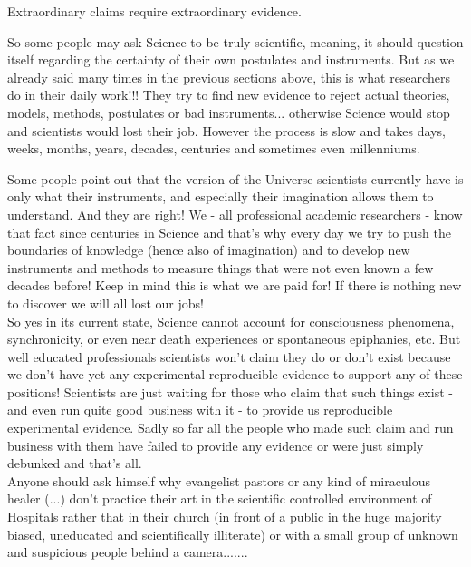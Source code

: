 	\begin{fquote}Extraordinary claims require extraordinary evidence.
 	\end{fquote}

	 So some people may ask Science to be truly scientific, meaning, it should question itself regarding the certainty of their own postulates and instruments. But as we already said many times in the previous sections above, this is what researchers do in their daily work!!! They try to find new evidence to reject actual theories, models, methods, postulates or bad instruments... otherwise Science would stop and scientists would lost their job. However the process is slow and takes days, weeks, months, years, decades, centuries and sometimes even millenniums.
	 
	\begin{tcolorbox}[enhanced,title=Remark,colframe=black,arc=10pt,drop lifted shadow,after skip=15pt plus 2pt,,breakable]
	Some people point out that the version of the Universe scientists currently have is only what their instruments, and especially their imagination allows them to understand. And they are right! We - all professional academic researchers - know that fact since centuries in Science and that's why every day we try to push the boundaries of knowledge (hence also of imagination) and to develop new instruments and methods to measure things that were not even known a few decades before! Keep in mind this is what we are paid for! If there is nothing new to discover we will all lost our jobs!\\
	
	So yes in its current state, Science cannot account for consciousness phenomena, synchronicity, or even near death experiences or spontaneous epiphanies, etc. But well educated professionals scientists won't claim they do or don't exist because we don't have yet any experimental reproducible evidence to support any of these positions! Scientists are just waiting for those who claim that such things exist - and even run quite good business with it - to provide us reproducible experimental evidence. Sadly so far all the people who made such claim and run business with them have failed to provide any evidence or were just simply debunked and that's all.\\
	
	Anyone should ask himself why evangelist pastors or any kind of miraculous healer (...) don't practice their art in the scientific controlled environment of Hospitals rather that in their church (in front of a public in the huge majority biased, uneducated and scientifically illiterate) or with a small group of unknown and suspicious people behind a camera.......
	\end{tcolorbox}
	 
